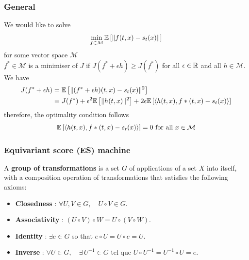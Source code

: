 \documentclass[a4paper,10pt]{article}
\begin{document}
\subsubsection{General}
We would like to solve
\begin{equation*}
    \min_{f\in\mathcal{M}} \mathbb{E} \left[ {\| f(t,x)-s_t(x)\|} \right]
\end{equation*}
for some vector space $\mathcal{M}$\\
$f^* \in \mathcal{M}$ is a minimiser of $J$ if $J(f^*+\epsilon h) \geq J(f^*)$ for all $\epsilon \in \mathbb{R}$ and all $h\in \mathcal{M}$. We have
\begin{align*}
    J(f^*+\epsilon h) &= \mathbb{E} \left[ {\|(f^*+\epsilon h)(t,x)-s_t(x)\|^2} \right]\\
    & = J(f^*)+\epsilon^2\mathbb{E} \left[ {\|h(t,x)\|^2} \right]+2\epsilon\mathbb{E} \left[ {\langle h(t,x),f*(t,x) - s_t(x) \rangle} \right]
\end{align*}
therefore, the optimality condition follows
\begin{equation}\label{eq:optimal_condition_score_function}
    \mathbb{E} \left[ {\langle h(t,x),f*(t,x) - s_t(x) \rangle} \right] = 0 \text{ for all } x \in \mathcal{M}
\end{equation}

\subsubsection{Equivariant score (ES) machine}
\begin{definition}
    A \textbf{group of transformations} is a set \( G \) of applications of a set \( X \) into itself, with a composition operation of transformations that satisfies the following axioms:
    \begin{itemize}[topsep=-5pt]
    \item[] \textbf{Closedness} : \( \forall U, V \in G, \quad U \circ V \in G \).
    \item[] \textbf{Associativity} : \( (U \circ V) \circ W = U \circ (V \circ W) \).
    \item[] \textbf{Identity} : \( \exists e \in G \) so that \( e \circ U = U \circ e = U \).
    \item[] \textbf{Inverse} : \( \forall U \in G, \quad \exists \,U^{-1} \in G \text{ tel que } U \circ U^{-1} = U^{-1} \circ U = e \).
\end{itemize}
\end{definition}



\end{document}
